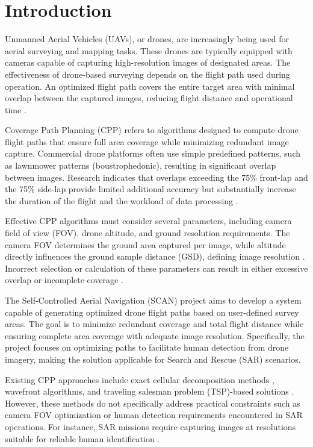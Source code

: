 \chapter{Introduction}

Unmanned Aerial Vehicles (UAVs), or drones, are increasingly being used for aerial surveying and mapping tasks. These drones are typically equipped with cameras capable of capturing high-resolution images of designated areas. The effectiveness of drone-based surveying depends on the flight path used during operation. An optimized flight path covers the entire target area with minimal overlap between the captured images, reducing flight distance and operational time \cite{MathworksUAV}.

Coverage Path Planning (CPP) refers to algorithms designed to compute drone flight paths that ensure full area coverage while minimizing redundant image capture. Commercial drone platforms often use simple predefined patterns, such as lawnmower patterns (boustrophedonic), resulting in significant overlap between images. Research indicates that overlaps exceeding the 75\% front-lap and the 75\% side-lap provide limited additional accuracy but substantially increase the duration of the flight and the workload of data processing \cite{AerotasOverlap}.

Effective CPP algorithms must consider several parameters, including camera field of view (FOV), drone altitude, and ground resolution requirements. The camera FOV determines the ground area captured per image, while altitude directly influences the ground sample distance (GSD), defining image resolution \cite{UAVCoveragePDF}. Incorrect selection or calculation of these parameters can result in either excessive overlap or incomplete coverage \cite{OptimizationUAV}.

The Self-Controlled Aerial Navigation (SCAN) project aims to develop a system capable of generating optimized drone flight paths based on user-defined survey areas. The goal is to minimize redundant coverage and total flight distance while ensuring complete area coverage with adequate image resolution. Specifically, the project focuses on optimizing paths to facilitate human detection from drone imagery, making the solution applicable for Search and Rescue (SAR) scenarios.

Existing CPP approaches include exact cellular decomposition methods \cite{UAVCoveragePDF}, wavefront algorithms, and traveling salesman problem (TSP)-based solutions \cite{SmoothCoverage}. However, these methods do not specifically address practical constraints such as camera FOV optimization or human detection requirements encountered in SAR operations. For instance, SAR missions require capturing images at resolutions suitable for reliable human identification \cite{NorwegianPolice}.

